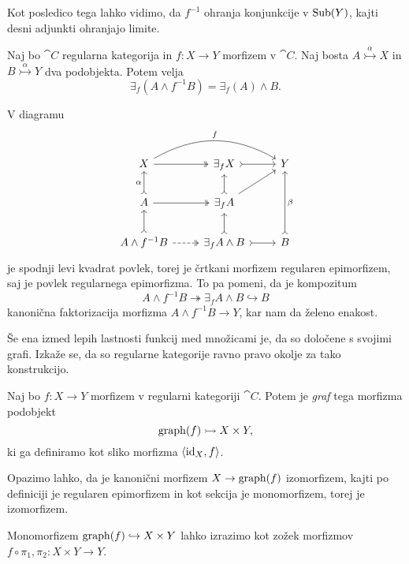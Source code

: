 \documentclass[../kategoricna_logika.tex]{subfiles}
\begin{document}
\noindent
Kot posledico tega lahko vidimo, da $f^{-1}$ ohranja konjunkcije v
$\operatorname{Sub}(Y)$, kajti desni adjunkti ohranjajo limite.
\begin{lema}[Frobenius]\label{lema:frobeniusova-lema}
  Naj bo $\cat{C}$ regularna kategorija in ${f : X \to Y}$ morfizem v
  $\cat{C}$.  Naj bosta $A \overset{\alpha}{\rightarrowtail} X$ in
  $B \overset{\alpha}{\rightarrowtail} Y$ dva podobjekta.  Potem velja
  $$\exists_f(A \wedge f^{-1}B) = \exists_f(A) \wedge B.$$
\end{lema}
\begin{dokaz}
  V diagramu
  \begin{equation*}
    \begin{tikzcd}
      X \ar[rr, bend left, "f"] \ar[r, two heads] & \exists_f X \ar[r, tail] & Y \\
      A \ar[u, tail, "\alpha"] \ar[r, two heads] & \exists_f A \ar[u, tail] \ar[ur] & \\
      A \land f^{-1}B \ar[u, tail] \ar[r, dashed, two heads] &
      \exists_f A \land B \ar[r, tail] \ar[u, tail] & B \ar[uu, tail,
      "\beta"']
    \end{tikzcd}
  \end{equation*}
  je spodnji levi kvadrat povlek, torej je črtkani morfizem regularen
  epimorfizem, saj je povlek regularnega epimorfizma.  To pa pomeni,
  da je kompozitum
  \[A \land f^{-1}B \twoheadrightarrow \exists_f A \land B
    \hookrightarrow B\] kanonična faktorizacija morfizma
  $A \land f^{-1}B \to Y$, kar nam da želeno enakost.
\end{dokaz}
Še ena izmed lepih lastnosti funkcij med množicami je, da so
določene s svojimi grafi.  Izkaže se, da so regularne kategorije ravno
pravo okolje za tako konstrukcijo.
\begin{definicija}\label{definicija:graf-morfizma}
  Naj bo $f : X \to Y$ morfizem v regularni kategoriji
  $\cat{C}$. Potem je \emph{graf} tega morfizma podobjekt
  $$\operatorname{graph}(f) \rightarrowtail X \times Y,$$
  ki ga definiramo kot sliko morfizma $\langle \mathrm{id}_X, f \rangle$.
\end{definicija}
Opazimo lahko, da je kanonični morfizem $X \to \operatorname{graph}(f)$ izomorfizem,
kajti po definiciji je regularen epimorfizem in kot sekcija je
monomorfizem, torej je izomorfizem.
\begin{lema}\label{lema:graf-kot-zozek}
  Monomorfizem $\operatorname{graph}(f) \hookrightarrow X \times Y$ lahko izrazimo
  kot zožek morfizmov $f\circ \pi_1, \pi_2 : X \times Y \to Y$.
\end{lema}
\end{document}
